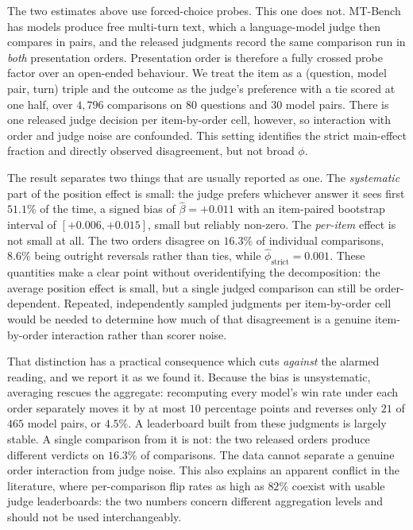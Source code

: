\documentclass[11pt]{article}
\begin{document}
The two estimates above use forced-choice probes. This one does not. MT-Bench
\cite{zhengmt2023judging} has models produce free multi-turn text, which a
language-model judge then compares in pairs, and the released judgments record
the same comparison run in \emph{both} presentation orders. Presentation order
is therefore a fully crossed probe factor over an open-ended behaviour. We treat
the item as a (question, model pair, turn) triple and the outcome as the judge's
preference with a tie scored at one half, over $4{,}796$ comparisons on $80$
questions and $30$ model pairs. There is one released judge decision per
item-by-order cell, however, so interaction with order and judge noise are
confounded. This setting identifies the strict main-effect fraction and directly
observed disagreement, but not broad $\phi$.

The result separates two things that are usually reported as one. The
\emph{systematic} part of the position effect is small: the judge prefers
whichever answer it sees first $51.1\%$ of the time, a signed bias of
$\hat\beta=+0.011$ with an item-paired bootstrap interval of
$[+0.006,+0.015]$, small but
reliably non-zero. The \emph{per-item} effect is not small at all. The two
orders disagree on $16.3\%$ of individual comparisons, $8.6\%$ being outright
reversals rather than ties, while $\hat\phi_{\text{strict}}=0.001$. These
quantities make a clear point without overidentifying the decomposition: the
average position effect is small, but a single judged comparison can still be
order-dependent. Repeated, independently sampled judgments per item-by-order cell
would be needed to determine how much of that disagreement is a genuine
item-by-order interaction rather than scorer noise.

That distinction has a practical consequence which cuts \emph{against} the
alarmed reading, and we report it as we found it. Because the bias is
unsystematic, averaging rescues the aggregate: recomputing every model's win
rate under each order separately moves it by at most $10$ percentage points and
reverses only $21$ of $465$ model pairs, or $4.5\%$. A leaderboard built from
these judgments is largely stable. A single comparison from it is not: the two
released orders produce different verdicts on $16.3\%$ of comparisons. The data
cannot separate a genuine order interaction from judge noise. This also explains an
apparent conflict in the literature, where per-comparison flip rates as high as
$82\%$ \cite{wang2024fair} coexist with usable judge leaderboards: the two
numbers concern different aggregation levels and should not be used
interchangeably.
\end{document}

